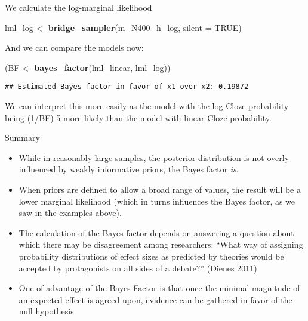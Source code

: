 \documentclass[12pt,ignorenonframetext,aspectratio=169]{beamer}
\newenvironment{Shaded}{\begin{snugshade}}{\end{snugshade}}
\newcommand{\DataTypeTok}[1]{\textcolor[rgb]{0.13,0.29,0.53}{#1}}
\newcommand{\KeywordTok}[1]{\textcolor[rgb]{0.13,0.29,0.53}{\textbf{#1}}}
\newcommand{\NormalTok}[1]{#1}
\newcommand{\OtherTok}[1]{\textcolor[rgb]{0.56,0.35,0.01}{#1}}
\newcommand{\StringTok}[1]{\textcolor[rgb]{0.31,0.60,0.02}{#1}}
\providecommand{\tightlist}{%
  \setlength{\itemsep}{0pt}\setlength{\parskip}{0pt}}
\begin{document}
\begin{frame}[fragile]

We calculate the log-marginal likelihood
\footnotesize

\begin{Shaded}
\begin{Highlighting}[]
\NormalTok{lml_log <-}\StringTok{ }\KeywordTok{bridge_sampler}\NormalTok{(m_N400_h_log, }\DataTypeTok{silent =} \OtherTok{TRUE}\NormalTok{)}
\end{Highlighting}
\end{Shaded}

\normalsize

And we can compare the models now:

\begin{Shaded}
\begin{Highlighting}[]
\NormalTok{(BF <-}\StringTok{ }\KeywordTok{bayes_factor}\NormalTok{(lml_linear, lml_log))}
\end{Highlighting}
\end{Shaded}

\begin{verbatim}
## Estimated Bayes factor in favor of x1 over x2: 0.19872
\end{verbatim}

\vspace{1cm}

We can interpret this more easily as the model with the log Cloze probability being (1/BF) 5 more likely than the model with linear Cloze probability.

\end{frame}

\begin{frame}{Summary}
\protect\hypertarget{summary}{}

\small

\begin{itemize}
\tightlist
\item
  While in reasonably large samples, the posterior distribution is not overly influenced by weakly informative priors, the Bayes factor \emph{is}.
\item
  When priors are defined to allow a broad range of values, the result will be a lower marginal likelihood (which in turns influences the Bayes factor, as we saw in the examples above).
\item
  The calculation of the Bayes factor depends on answering a question about which there may be disagreement among researchers: ``What way of assigning probability distributions of effect sizes as predicted by theories would be accepted by protagonists on all sides of a debate?'' (Dienes 2011)
\item
  One of advantage of the Bayes Factor is that once the minimal magnitude of an expected effect is agreed upon, evidence can be gathered in favor of the null hypothesis.
\end{itemize}

\end{frame}
\end{document}
